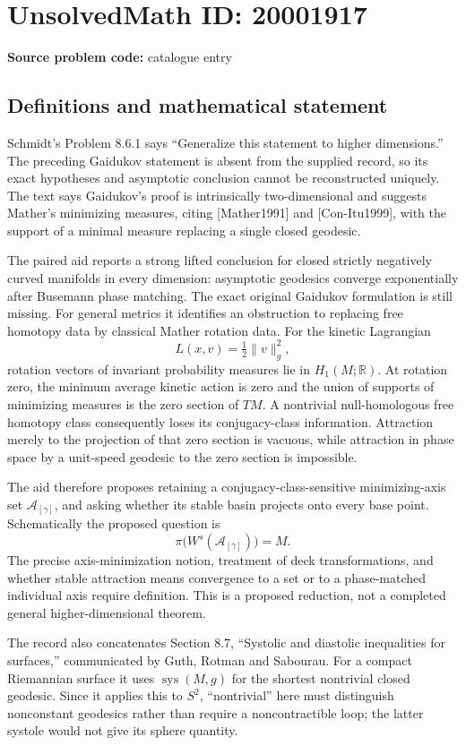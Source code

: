 \documentclass[11pt]{article}
\begin{document}
\section*{UnsolvedMath ID: 20001917}
\textbf{Source problem code:} catalogue entry
\subsection{Definitions and mathematical statement}
Schmidt's Problem 8.6.1 says ``Generalize this statement to higher dimensions.'' The preceding Gaidukov statement is absent from the supplied record, so its exact hypotheses and asymptotic conclusion cannot be reconstructed uniquely. The text says Gaidukov's proof is intrinsically two-dimensional and suggests Mather's minimizing measures, citing [Mather1991] and [Con-Itu1999], with the support of a minimal measure replacing a single closed geodesic.

The paired aid reports a strong lifted conclusion for closed strictly negatively curved manifolds in every dimension: asymptotic geodesics converge exponentially after Busemann phase matching. The exact original Gaidukov formulation is still missing. For general metrics it identifies an obstruction to replacing free homotopy data by classical Mather rotation data. For the kinetic Lagrangian
\[
 L(x,v)=\tfrac12\|v\|_g^2,
\]
rotation vectors of invariant probability measures lie in \(H_1(M;\mathbb R)\). At rotation zero, the minimum average kinetic action is zero and the union of supports of minimizing measures is the zero section of \(TM\). A nontrivial null-homologous free homotopy class consequently loses its conjugacy-class information. Attraction merely to the projection of that zero section is vacuous, while attraction in phase space by a unit-speed geodesic to the zero section is impossible.

The aid therefore proposes retaining a conjugacy-class-sensitive minimizing-axis set \(\mathcal A_{[\gamma]}\), and asking whether its stable basin projects onto every base point. Schematically the proposed question is
\[
 \pi\bigl(W^s(\mathcal A_{[\gamma]})\bigr)=M.
\]
The precise axis-minimization notion, treatment of deck transformations, and whether stable attraction means convergence to a set or to a phase-matched individual axis require definition. This is a proposed reduction, not a completed general higher-dimensional theorem.

The record also concatenates Section 8.7, ``Systolic and diastolic inequalities for surfaces,'' communicated by Guth, Rotman and Sabourau. For a compact Riemannian surface it uses \(\operatorname{sys}(M,g)\) for the shortest nontrivial closed geodesic. Since it applies this to \(S^2\), ``nontrivial'' here must distinguish nonconstant geodesics rather than require a noncontractible loop; the latter systole would not give its sphere quantity.
\end{document}
